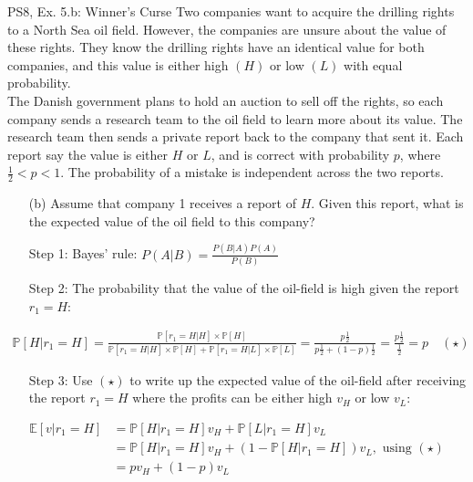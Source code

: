 \begin{frame}{PS8, Ex. 5.b: Winner's Curse}
      Two companies want to acquire the drilling rights to a North Sea oil field. However, the companies are unsure about the value of these rights. They know the drilling rights have an identical value for both companies, and this value is either high $(H)$ or low $(L)$ with equal probability.\\\smallskip
      The Danish government plans to hold an auction to sell off the rights, so each company sends a research team to the oil field to learn more about its value. The research team then sends a private report back to the company that sent it. Each report say the value is either $H$ or $L$, and is correct with probability $p$, where $\frac{1}{2} < p < 1$. The probability of a mistake is independent across the two reports.
      \begin{itemize}
        \item[(b)] Assume that company 1 receives a report of $H$. Given this report, what is the expected value of the oil field to this company?
        \item[Step 1:] Bayes' rule: $P(A|B)=\frac{P(B|A)P(A)}{P(B)}$
        \item[Step 2:] The probability that the value of the oil-field is high given the report $r_1=H$:
        \end{itemize}
        \vspace{-8pt}
        \begin{align*}
          \mathbb{P}[H|r_1=H]=\frac{\mathbb{P}[r_1=H|H]\times\mathbb{P}[H]}{\mathbb{P}[r_1=H|H]\times\mathbb{P}[H]+\mathbb{P}[r_1=H|L]\times\mathbb{P}[L]}=\frac{p\frac{1}{2}}{p\frac{1}{2}+(1-p)\frac{1}{2}}=\frac{p\frac{1}{2}}{\frac{1}{2}}=p\quad (\star)
        \end{align*}
        \vspace{-10pt}
        \begin{itemize}
        \item[Step 3:] Use $(\star)$ to write up the expected value of the oil-field after receiving the report $r_1=H$ where the profits can be either high $v_H$ or low $v_L$:
      \end{itemize}
      \vspace{-6pt}
      \begin{align*}
        \mathbb{E}[v|r_1=H]&=\mathbb{P}[H|r_1=H]v_H+\mathbb{P}[L|r_1=H]v_L\\
        &=\mathbb{P}[H|r_1=H]v_H+\left(1-\mathbb{P}[H|r_1=H]\right)v_L,\text{ using }(\star)\\
        &=pv_H+(1-p)v_L
      \end{align*}
      \vfill\null
\end{frame}


